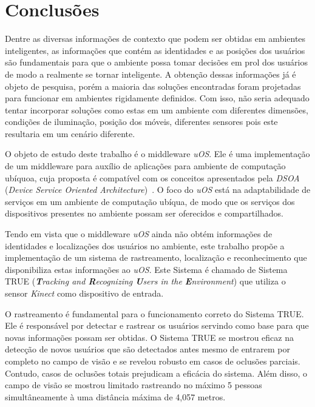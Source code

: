 \chapter{Conclusões}
\label{cap:conclusao}




Dentre as diversas informações de contexto que podem ser obtidas em ambientes inteligentes, as informações que contém as identidades e as posições dos usuários são fundamentais para que o ambiente possa tomar decisões em prol dos usuários de modo a realmente se tornar inteligente. A obtenção dessas informações já é objeto de pesquisa, porém a maioria das soluções encontradas foram projetadas para funcionar em ambientes rigidamente definidos. Com isso, não seria adequado tentar incorporar soluções como estas em um ambiente com diferentes dimensões, condições de iluminação, posição dos móveis, diferentes sensores pois este resultaria em um cenário diferente.

O objeto de estudo deste trabalho é o middleware \textit{uOS}. Ele é uma implementação de um middleware para auxílio de aplicações para ambiente de computação ubíquoa, cuja proposta é compatível com os conceitos apresentados pela \textit{DSOA} (\textit{Device Service Oriented Architecture})~\cite{fabriciobuzzeto}. O foco do \textit{uOS} está na adaptabilidade de serviços em um ambiente de computação ubíqua, de modo que os serviços dos dispositivos presentes no ambiente possam ser oferecidos e compartilhados.

Tendo em vista que o middleware \textit{uOS} ainda não obtém informações de identidades e localizações dos usuários no ambiente, este
trabalho propõe a implementação de um sistema de rastreamento, localização e reconhecimento que disponibiliza estas informações ao \textit{uOS}. Este Sistema é chamado de Sistema TRUE (\textit{\textbf{T}racking and \textbf{R}ecognizing \textbf{U}sers in the \textbf{E}nvironment}) que utiliza o sensor \textit{Kinect} como dispositivo de entrada.

O rastreamento é fundamental para o funcionamento correto do Sistema TRUE. Ele é responsável por detectar e rastrear os usuários servindo como base para que novas informações possam ser obtidas. O Sistema TRUE se mostrou eficaz na detecção de novos usuários que são detectados antes mesmo de entrarem por completo no campo de visão e se revelou robusto em casos de oclusões parciais. Contudo, casos de oclusões totais prejudicam a eficácia do sistema. Além disso, o campo de visão se mostrou limitado rastreando no máximo 5 pessoas simultâneamente à uma distância máxima de 4,057 metros.

